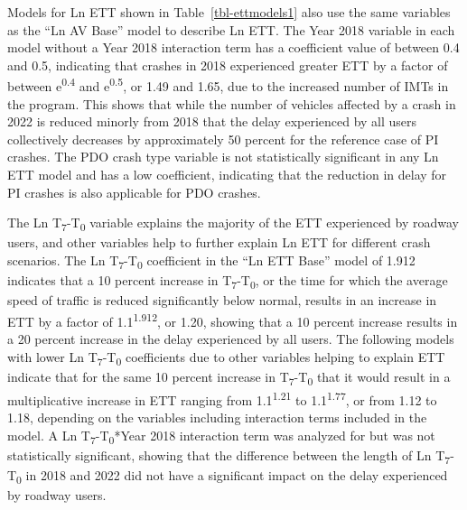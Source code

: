 \documentclass[
  letterpaper,
  authoryear]{elsarticle}
\begin{document}
Models for Ln ETT shown in Table~\ref{tbl-ettmodels1} also use the same
variables as the ``Ln AV Base'' model to describe Ln ETT. The Year 2018
variable in each model without a Year 2018 interaction term has a
coefficient value of between 0.4 and 0.5, indicating that crashes in
2018 experienced greater ETT by a factor of between
e\textsuperscript{0.4} and e\textsuperscript{0.5}, or 1.49 and 1.65, due
to the increased number of IMTs in the program. This shows that while
the number of vehicles affected by a crash in 2022 is reduced minorly
from 2018 that the delay experienced by all users collectively decreases
by approximately 50 percent for the reference case of PI crashes. The
PDO crash type variable is not statistically significant in any Ln ETT
model and has a low coefficient, indicating that the reduction in delay
for PI crashes is also applicable for PDO crashes.

The Ln T\textsubscript{7}-T\textsubscript{0} variable explains the
majority of the ETT experienced by roadway users, and other variables
help to further explain Ln ETT for different crash scenarios. The Ln
T\textsubscript{7}-T\textsubscript{0} coefficient in the ``Ln ETT Base''
model of 1.912 indicates that a 10 percent increase in
T\textsubscript{7}-T\textsubscript{0}, or the time for which the average
speed of traffic is reduced significantly below normal, results in an
increase in ETT by a factor of 1.1\textsuperscript{1.912}, or 1.20,
showing that a 10 percent increase results in a 20 percent increase in
the delay experienced by all users. The following models with lower Ln
T\textsubscript{7}-T\textsubscript{0} coefficients due to other
variables helping to explain ETT indicate that for the same 10 percent
increase in T\textsubscript{7}-T\textsubscript{0} that it would result
in a multiplicative increase in ETT ranging from
1.1\textsuperscript{1.21} to 1.1\textsuperscript{1.77}, or from 1.12 to
1.18, depending on the variables including interaction terms included in
the model. A Ln T\textsubscript{7}-T\textsubscript{0}*Year 2018
interaction term was analyzed for but was not statistically significant,
showing that the difference between the length of Ln
T\textsubscript{7}-T\textsubscript{0} in 2018 and 2022 did not have a
significant impact on the delay experienced by roadway users.
\end{document}
